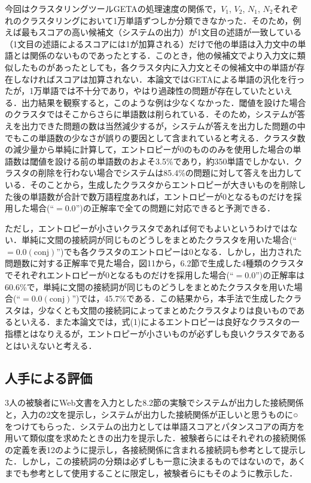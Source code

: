\documentclass[japanese]{jnlp_1.4}
\begin{document}
今回はクラスタリングツールGETAの処理速度の関係で，$V_{1}$, $V_{2}$, $N_{1}$, $N_{2}$それぞれのクラスタリングにおいて1万単語ずつしか分類できなかった．そのため，例えば最もスコアの高い候補文（システムの出力）が1文目の述語が一致している（1文目の述語によるスコアには1が加算される）だけで他の単語は入力文中の単語とは関係のないものであったとする．このとき，他の候補文でより入力文に類似したものがあったとしても，各クラスタ内に入力文とその候補文中の単語が存在しなければスコアは加算されない．本論文ではGETAによる単語の汎化を行ったが，1万単語では不十分であり，やはり過疎性の問題が存在していたといえる．出力結果を観察すると，このような例は少なくなかった．閾値を設けた場合のクラスタではそこからさらに単語数は削られている．そのため，システムが答えを出力できた問題の数は当然減少するが，システムが答えを出力した問題の中でもこの単語数の少なさが誤りの要因として含まれていると考える．クラスタ数の減少量から単純に計算して，エントロピーが0のもののみを使用した場合の単語数は閾値を設ける前の単語数のおよそ3.5\%であり，約350単語でしかない．クラスタの削除を行わない場合でシステムは85.4\%の問題に対して答えを出力している．そのことから，生成したクラスタからエントロピーが大きいものを削除した後の単語数が合計で数万語程度あれば，エントロピーが0となるものだけを採用した場合(``$=0.0$'')の正解率で全ての問題に対応できると予測できる．

ただし，エントロピーが小さいクラスタであれば何でもよいというわけではない．単純に文間の接続詞が同じものどうしをまとめたクラスタを用いた場合(``$=0.0(\mathrm{conj})$'')でも各クラスタのエントロピーは0となる．しかし，出力された問題数に対する正解率で見た場合，図11から，6.2節で生成した4種類のクラスタでそれぞれエントロピーが0となるものだけを採用した場合(``$=0.0$'')の正解率は60.6{\%}で，単純に文間の接続詞が同じものどうしをまとめたクラスタを用いた場合(``$=0.0(\mathrm{conj})$'')では，45.7{\%}である．この結果から，本手法で生成したクラスタは，少なくとも文間の接続詞によってまとめたクラスタよりは良いものであるといえる．また本論文では，式(1)によるエントロピーは良好なクラスタの一指標とはなりえるが，エントロピーが小さいものが必ずしも良いクラスタであるとはいえないと考える．

\subsection{人手による評価}

3人の被験者にWeb文書を入力とした8.2節の実験でシステムが出力した接続関係と，入力の2文を提示し，システムが出力した接続関係が正しいと思うものに○をつけてもらった．システムの出力としては単語スコアとパタンスコアの両方を用いて類似度を求めたときの出力を提示した．被験者らにはそれぞれの接続関係の定義を表12のように提示し，各接続関係に含まれる接続詞も参考として提示した．しかし，この接続詞の分類は必ずしも一意に決まるものではないので，あくまでも参考として使用することに限定し，被験者らにもそのように教示した．
\end{document}
